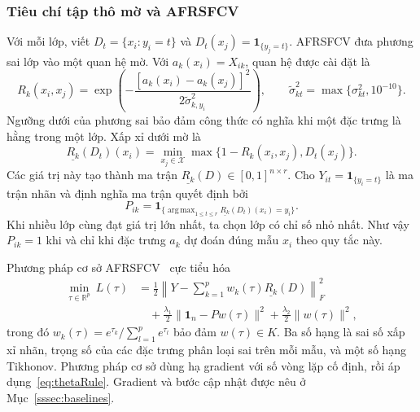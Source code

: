\documentclass[]{interact}
\theoremstyle{plain}
\theoremstyle{definition}
\theoremstyle{remark}
\newcommand{\R}{\mathbb{R}}
\DeclareMathOperator*{\argmax}{arg\,max}
\begin{document}
\subsubsection{Tiêu chí tập thô mờ và AFRSFCV}\label{ssec:afrsfcv}\label{sssec:afrsfcv-inputs}\label{sssec:afrsfcv-model}
Với mỗi lớp, viết $D_t=\{x_i:y_i=t\}$ và $D_t(x_j)=\mathbf1_{\{y_j=t\}}$. AFRSFCV đưa phương sai lớp vào một quan hệ mờ. Với $a_k(x_i)=X_{ik}$, quan hệ được cài đặt là
\begin{equation}\label{eq:simRel}
R_k(x_i,x_j)=\exp\!\left(-\frac{[a_k(x_i)-a_k(x_j)]^2}{2\widetilde\sigma_{k,y_i}^2}\right),
\qquad \widetilde\sigma_{kt}^2=\max\{\sigma_{kt}^2,10^{-10}\}.
\end{equation}
Ngưỡng dưới của phương sai bảo đảm công thức có nghĩa khi một đặc trưng là hằng trong một lớp. Xấp xỉ dưới mờ là
\begin{equation}\label{eq:lower}
\underline{R_k}(D_t)(x_i)=\min_{x_j\in\mathcal{X}}\max\{1-R_k(x_i,x_j),D_t(x_j)\}.
\end{equation}
Các giá trị này tạo thành ma trận $\underline{R_k}(D)\in[0,1]^{n\times r}$. Cho $Y_{it}=\mathbf1_{\{y_i=t\}}$ là ma trận nhãn và định nghĩa ma trận quyết định bởi
\begin{equation}\label{eq:Pmat}
P_{ik}=\mathbf1_{\{\argmax_{1\le t\le r}\underline{R_k}(D_t)(x_i)=y_i\}}.
\end{equation}
Khi nhiều lớp cùng đạt giá trị lớn nhất, ta chọn lớp có chỉ số nhỏ nhất. Như vậy $P_{ik}=1$ khi và chỉ khi đặc trưng $a_k$ dự đoán đúng mẫu $x_i$ theo quy tắc này.

Phương pháp cơ sở AFRSFCV~\citep{wang2026afrsfcv} cực tiểu hóa
\begin{equation}\label{eq:afrsfcvLoss}
\begin{split}
\min_{\tau\in\R^p}\ L(\tau)
&=\frac12\left\|Y-\sum_{k=1}^{p}w_k(\tau)\underline{R_k}(D)\right\|_F^2\\
&\quad+\frac{\lambda_1}{2}\|\mathbf1_n-Pw(\tau)\|^2+\frac{\lambda_2}{2}\|w(\tau)\|^2,
\end{split}
\end{equation}
trong đó $w_k(\tau)=e^{\tau_k}/\sum_{l=1}^{p}e^{\tau_l}$ bảo đảm $w(\tau)\in K$. Ba số hạng là sai số xấp xỉ nhãn, trọng số của các đặc trưng phân loại sai trên mỗi mẫu, và một số hạng Tikhonov. Phương pháp cơ sở dùng hạ gradient với số vòng lặp cố định, rồi áp dụng~\eqref{eq:thetaRule}. Gradient và bước cập nhật được nêu ở Mục~\ref{sssec:baselines}.
\end{document}
